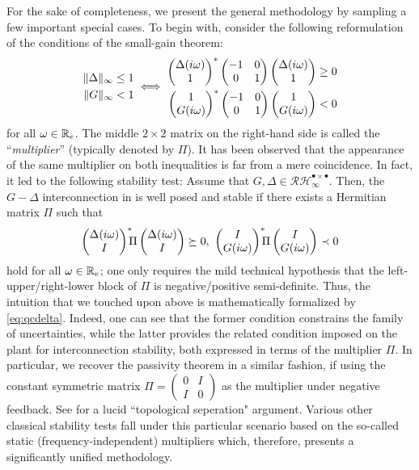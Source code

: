 For the sake of completeness, we present the general methodology by sampling a few important special cases. 
To begin with, consider the following reformulation of the conditions of the small-gain theorem:
\begin{equation}
\begin{aligned}
\|\Delta\|_\infty &\leq 1\\
\|G\|_\infty &< 1
\end{aligned} \iff
{\scriptstyle \begin{aligned}
\begin{pmatrix}\Delta(i\omega)\\1\end{pmatrix}^*\begin{pmatrix}-1 &0\\0 &1\end{pmatrix}\begin{pmatrix}\Delta(i\omega)\\1\end{pmatrix} &\geq 0\\
\begin{pmatrix}1\\G(i\omega)\end{pmatrix}^*\begin{pmatrix}-1 &0\\0 &1\end{pmatrix}\begin{pmatrix}1\\G(i\omega)\end{pmatrix} &< 0
\end{aligned}}
\label{eq:smqf}
\end{equation}
for all $\omega\in\mathbb{R}_e$. The middle {$2\times2$ matrix} on the right-hand side is called the 
``\emph{multiplier}'' (typically denoted by $\Pi$). It has been observed that the appearance of the 
same multiplier on both inequalities is far from a mere coincidence. In fact, it led to the following 
stability test: Assume that $G,\Delta\in \mathcal{RH}^{\bullet \times \bullet}_\infty$. Then, the 
$G-\Delta$ interconnection {in } is well posed and stable if there exists a 
Hermitian matrix $\Pi$ such that
\begin{equation}
\begin{pmatrix}\Delta(i\omega)\\I\end{pmatrix}^*\!\!\!\Pi\begin{pmatrix}\Delta(i\omega)\\I\end{pmatrix} \succeq 0,\
\begin{pmatrix}I\\G(i\omega)\end{pmatrix}^*\!\!\!\Pi\begin{pmatrix}I\\G(i\omega)\end{pmatrix} \prec 0  \label{eq:qcdelta}
\end{equation}
hold for all $\omega\in\mathbb{R}_e$; one only requires the mild technical hypothesis that the left-upper/right-lower 
block of $\Pi$ is negative/positive semi-definite. Thus, the intuition that we touched upon above is mathematically 
formalized by \eqref{eq:qcdelta}. Indeed, one can see that the former condition constrains the family of uncertainties,
 while the latter {provides the related condition} imposed on the plant for interconnection stability, both expressed 
in terms of the multiplier $\Pi$. In particular, we recover the passivity theorem in a similar fashion, if {using} 
the constant symmetric matrix $\Pi=\left(\begin{smallmatrix}0 &I \\ I &0 \end{smallmatrix} \right)$ as the multiplier 
under negative feedback. See \cite{safonov} for a lucid ``topological seperation" argument. Various other classical 
stability tests fall under this particular {scenario based on the so-called static (frequency-independent) multipliers 
which, therefore, presents} a significantly unified methodology.

